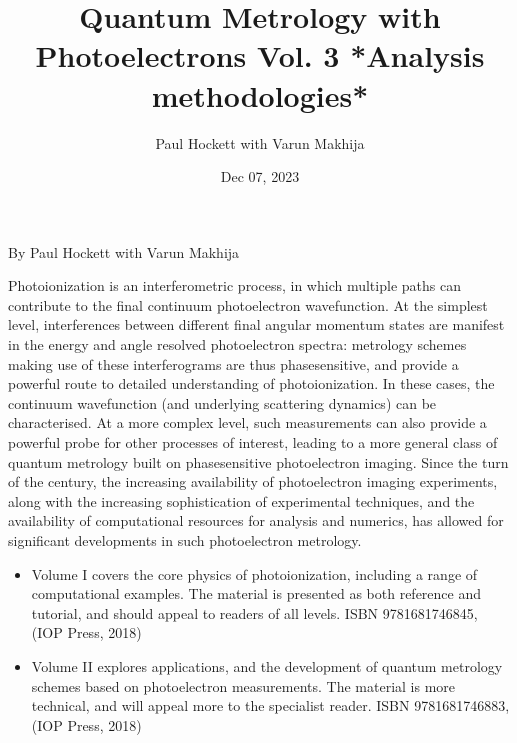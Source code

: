 \documentclass[letterpaper,table,10pt,english]{jupyterBook}
\title{Quantum Metrology with Photoelectrons Vol. 3 *Analysis methodologies*}
\date{Dec 07, 2023}
\author{Paul Hockett with Varun Makhija}
\begin{document}
\pagestyle{empty}
\sphinxmaketitle
\pagestyle{plain}
\sphinxtableofcontents
\pagestyle{normal}
\label{\detokenize{intro::doc}}


\begin{DUlineblock}{0em}
\item[] 
\end{DUlineblock}

\sphinxAtStartPar
By Paul Hockett with Varun Makhija

\begin{DUlineblock}{0em}
\item[] 
\end{DUlineblock}

\sphinxAtStartPar
Photoionization is an interferometric process, in which multiple paths can contribute to the final continuum photoelectron wavefunction. At the simplest level, interferences between different final angular momentum states are manifest in the energy and angle resolved photoelectron spectra: metrology schemes making use of these interferograms are thus phase\sphinxhyphen{}sensitive, and provide a powerful route to detailed understanding of photoionization. In these cases, the continuum wavefunction (and underlying scattering dynamics) can be characterised. At a more complex level, such measurements can also provide a powerful probe for other processes of interest, leading to a more general class of quantum metrology built on phase\sphinxhyphen{}sensitive photoelectron imaging.  Since the turn of the century, the increasing availability of photoelectron imaging experiments, along with the increasing sophistication of experimental techniques, and the availability of computational resources for analysis and numerics, has allowed for significant developments in such photoelectron metrology.

\begin{itemize}
\item {} 
\sphinxAtStartPar
Volume I covers the core physics of photoionization, including a range of computational examples. The material is presented as both reference and tutorial, and should appeal to readers of all levels. ISBN 978\sphinxhyphen{}1\sphinxhyphen{}6817\sphinxhyphen{}4684\sphinxhyphen{}5,  (IOP Press, 2018)

\item {} 
\sphinxAtStartPar
Volume II explores applications, and the development of quantum metrology schemes based on photoelectron measurements. The material is more technical, and will appeal more to the specialist reader. ISBN 978\sphinxhyphen{}1\sphinxhyphen{}6817\sphinxhyphen{}4688\sphinxhyphen{}3,  (IOP Press, 2018)

\end{itemize}
\end{document}
